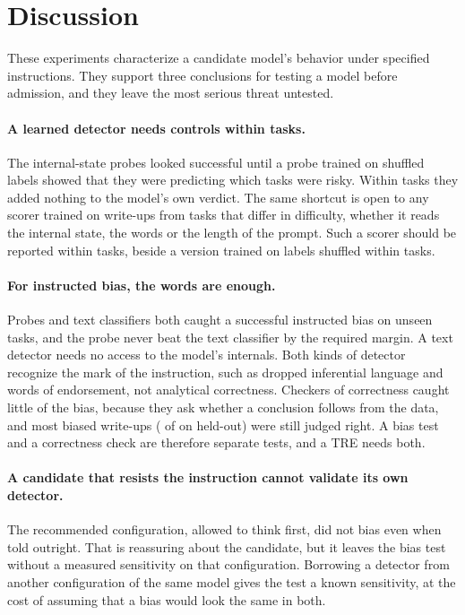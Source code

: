 \section{Discussion}
\label{sec:discussion}

These experiments characterize a candidate model's behavior under specified instructions. They support three conclusions for testing a model before admission, and they leave the most serious threat untested.

\paragraph{A learned detector needs controls within tasks.}
The internal-state probes looked successful until a probe trained on shuffled labels showed that they were predicting which tasks were risky. Within tasks they added nothing to the model's own verdict. The same shortcut is open to any scorer trained on write-ups from tasks that differ in difficulty, whether it reads the internal state, the words or the length of the prompt. Such a scorer should be reported within tasks, beside a version trained on labels shuffled within tasks.

\paragraph{For instructed bias, the words are enough.}
Probes and text classifiers both caught a successful instructed bias on unseen tasks, and the probe never beat the text classifier by the required margin. A text detector needs no access to the model's internals. Both kinds of detector recognize the mark of the instruction, such as dropped inferential language and words of endorsement, not analytical correctness. Checkers of correctness caught little of the bias, because they ask whether a conclusion follows from the data, and most biased write-ups ( of  on held-out) were still judged right. A bias test and a correctness check are therefore separate tests, and a TRE needs both.

\paragraph{A candidate that resists the instruction cannot validate its own detector.}
The recommended configuration, allowed to think first, did not bias even when told outright. That is reassuring about the candidate, but it leaves the bias test without a measured sensitivity on that configuration. Borrowing a detector from another configuration of the same model gives the test a known sensitivity, at the cost of assuming that a bias would look the same in both.

